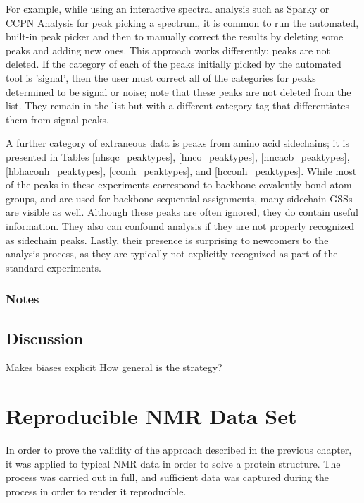 For example, while using an interactive spectral analysis such as Sparky or
CCPN Analysis \cite{sparky, ccpn} for peak picking a spectrum, it is common
to run the automated, built-in peak picker and then to manually correct the
results by deleting some peaks and adding new ones.  This approach works
differently; peaks are not deleted.  If the category of each of the
peaks initially picked by the automated tool is 'signal', then the
user must correct all of the categories for peaks 
determined to be signal or noise; note that these peaks are not deleted
from the list.  They remain in the list but with a different category
tag that differentiates them from signal peaks.

A further category of extraneous data is peaks from amino acid sidechains; 
it is presented in Tables \ref{nhsqc_peaktypes}, \ref{hnco_peaktypes}, 
\ref{hncacb_peaktypes}, \ref{hbhaconh_peaktypes}, \ref{cconh_peaktypes}, and
\ref{hcconh_peaktypes}.  While most of the
peaks in these experiments correspond to backbone covalently bond atom groups, 
and are used for backbone sequential assignments, many sidechain GSSs are
visible as well.  Although these peaks are often ignored, they do contain
useful information.  They also can confound analysis if they are not properly
recognized as sidechain peaks.  Lastly, their presence is surprising to 
newcomers to the analysis process, as they are typically not explicitly 
recognized as part of the standard experiments.

\subsection*{Notes}


\section{Discussion}
Makes biases explicit
How general is the strategy?



\chapter{Reproducible NMR Data Set}

In order to prove the validity of the approach described in the previous
chapter, it was applied to typical NMR data in order to solve a protein
structure.  The process was carried out in full, and sufficient data was
captured during the process in order to render it reproducible.


